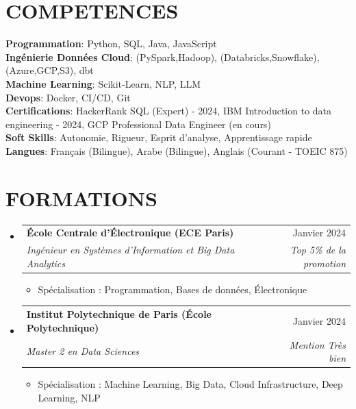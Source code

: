 \documentclass[11pt,a4paper]{article}
\makeatletter
\newcommand{\resumeItem}[1]{
  \item\footnotesize{
    {#1 \vspace{-1pt}}
  }
}
\newcommand{\resumeSubheading}[4]{
  \vspace{2pt}\item
    \begin{tabular*}{\textwidth}[t]{l@{\extracolsep{\fill}}r}
      {\footnotesize\textbf{#1}} & {\footnotesize#2} \\
      {\footnotesize\textit{#3}} & {\footnotesize\textit{#4}} \\
    \end{tabular*}\vspace{2pt}
}
\newcommand{\resumeSubHeadingListStart}{\begin{itemize}[leftmargin=0in, label={}]}
\newcommand{\resumeSubHeadingListEnd}{\end{itemize}}
\newcommand{\resumeItemListStart}{\begin{itemize}[label={\textbullet}]}
\newcommand{\resumeItemListEnd}{\end{itemize}\vspace{0pt}}
\makeatother
\begin{document}
\section{COMPETENCES}
\begin{itemize}[leftmargin=0in, label={}]
\footnotesize{\item{
{\footnotesize\textbf{Programmation}:} {\footnotesize Python, SQL, Java, JavaScript} \\
\vspace{3pt}
{\footnotesize\textbf{Ingénierie Données Cloud}:} {\footnotesize (PySpark,Hadoop), (Databricks,Snowflake), (Azure,GCP,S3), dbt} \\
\vspace{3pt}
{\footnotesize\textbf{Machine Learning}:} {\footnotesize Scikit-Learn, NLP, LLM} \\
\vspace{3pt}
{\footnotesize\textbf{Devops}:} {\footnotesize Docker, CI/CD, Git} \\
\vspace{3pt}
{\footnotesize\textbf{Certifications}:} {\footnotesize HackerRank SQL (Expert) - 2024, IBM Introduction to data engineering - 2024, GCP Professional Data Engineer (en cours)} \\
\vspace{3pt}
{\footnotesize\textbf{Soft Skills}:} {\footnotesize Autonomie, Rigueur, Esprit d'analyse, Apprentissage rapide} \\
\vspace{3pt}
{\footnotesize\textbf{Langues}:} {\footnotesize Français (Bilingue), Arabe (Bilingue), Anglais (Courant - TOEIC 875)}
}
}
\end{itemize}

\section{FORMATIONS}
\resumeSubHeadingListStart
    \resumeSubheading
      {École Centrale d'Électronique (ECE Paris)}
      {Janvier 2024}
      {Ingénieur en Systèmes d'Information et Big Data Analytics}
      {Top 5\% de la promotion}
      \resumeItemListStart
        \resumeItem{Spécialisation : Programmation, Bases de données, Électronique}
      \resumeItemListEnd
    \resumeSubheading
      {Institut Polytechnique de Paris (École Polytechnique)}
      {Janvier 2024}
      {Master 2 en Data Sciences}
      {Mention Très bien}
      \resumeItemListStart
        \resumeItem{Spécialisation : Machine Learning, Big Data, Cloud Infrastructure, Deep Learning, NLP}
      \resumeItemListEnd
  \resumeSubHeadingListEnd
\end{document}
